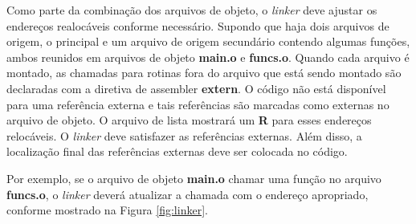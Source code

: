 Como parte da combinação dos arquivos de objeto, o \textit{linker} deve ajustar os endereços realocáveis conforme necessário. Supondo que haja dois arquivos de origem, o principal e um arquivo de origem secundário contendo algumas funções, ambos reunidos em arquivos de objeto \textbf{main.o} e \textbf{funcs.o}. Quando cada arquivo é montado, as chamadas para rotinas fora do arquivo que está sendo montado são declaradas com a diretiva de assembler \textbf{extern}. O código não está disponível para uma referência externa e tais referências são marcadas como externas no arquivo de objeto. O arquivo de lista mostrará um \textbf{R} para esses endereços relocáveis. O \textit{linker} deve satisfazer as referências externas. Além disso, a localização final das referências externas deve ser colocada no código.

Por exemplo, se o arquivo de objeto \textbf{main.o} chamar uma função no arquivo \textbf{funcs.o}, o \textit{linker} deverá atualizar a chamada com o endereço apropriado, conforme mostrado na Figura \ref{fig:linker}.



